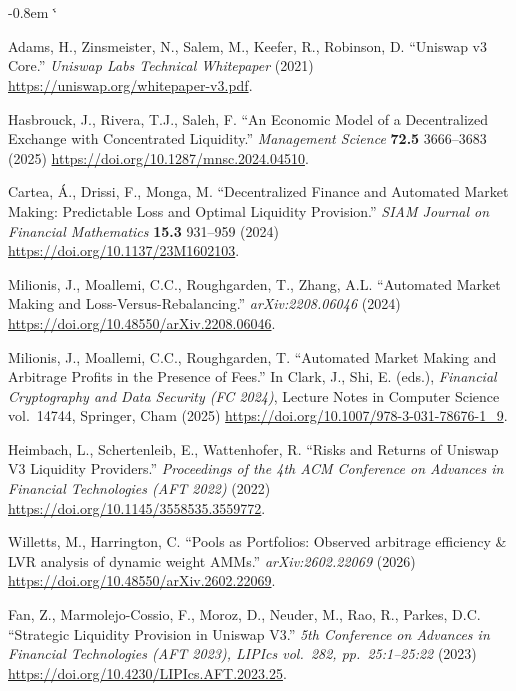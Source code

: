 \documentclass[11pt,a4paper]{article}
\makeatletter
\renewenvironment{thebibliography}[1]
  {\section*{\refname}%
   \fontsize{10pt}{12pt}\selectfont
   \list{\@biblabel{\@arabic\c@enumiv}}%
        {\settowidth\labelwidth{\@biblabel{#1}}%
         \leftmargin\labelwidth
         \advance\leftmargin-0.8em
         \advance\leftmargin\labelsep
         \setlength\itemindent{1em}%
         \setlength\itemsep{6pt plus 1pt minus 1pt}%
         \setlength\parsep{0pt}%
         \usecounter{enumiv}%
         \let\p@enumiv\@empty
         \renewcommand\theenumiv{\@arabic\c@enumiv}}%
   \sloppy\clubpenalty4000\widowpenalty4000\sfcode`\.\@m}
  {\def\@noitemerr{\@latex@warning{Empty `thebibliography' environment}}%
   \endlist}
\theoremstyle{plain}
\makeatother
\begin{document}
\pagestyle{plain}
\begin{thebibliography}{99}

Adams, H., Zinsmeister, N., Salem, M., Keefer, R., Robinson, D. ``Uniswap v3 Core.'' \emph{Uniswap Labs Technical Whitepaper} (2021) \url{https://uniswap.org/whitepaper-v3.pdf}.

Hasbrouck, J., Rivera, T.J., Saleh, F. ``An Economic Model of a Decentralized Exchange with Concentrated Liquidity.'' \emph{Management Science} \textbf{72.5} 3666--3683 (2025) \url{https://doi.org/10.1287/mnsc.2024.04510}.

Cartea, \'A., Drissi, F., Monga, M. ``Decentralized Finance and Automated Market Making: Predictable Loss and Optimal Liquidity Provision.'' \emph{SIAM Journal on Financial Mathematics} \textbf{15.3} 931--959 (2024) \url{https://doi.org/10.1137/23M1602103}.

Milionis, J., Moallemi, C.C., Roughgarden, T., Zhang, A.L. ``Automated Market Making and Loss-Versus-Rebalancing.'' \emph{arXiv:2208.06046} (2024) \url{https://doi.org/10.48550/arXiv.2208.06046}.

Milionis, J., Moallemi, C.C., Roughgarden, T. ``Automated Market Making and Arbitrage Profits in the Presence of Fees.'' In Clark, J., Shi, E. (eds.), \emph{Financial Cryptography and Data Security (FC 2024)}, Lecture Notes in Computer Science vol.~14744, Springer, Cham (2025) \url{https://doi.org/10.1007/978-3-031-78676-1_9}.

Heimbach, L., Schertenleib, E., Wattenhofer, R. ``Risks and Returns of Uniswap V3 Liquidity Providers.'' \emph{Proceedings of the 4th ACM Conference on Advances in Financial Technologies (AFT 2022)} (2022) \url{https://doi.org/10.1145/3558535.3559772}.

Willetts, M., Harrington, C. ``Pools as Portfolios: Observed arbitrage efficiency \& LVR analysis of dynamic weight AMMs.'' \emph{arXiv:2602.22069} (2026) \url{https://doi.org/10.48550/arXiv.2602.22069}.

Fan, Z., Marmolejo-Cossio, F., Moroz, D., Neuder, M., Rao, R., Parkes, D.C. ``Strategic Liquidity Provision in Uniswap V3.'' \emph{5th Conference on Advances in Financial Technologies (AFT 2023), LIPIcs vol.~282, pp.~25:1--25:22} (2023) \url{https://doi.org/10.4230/LIPIcs.AFT.2023.25}.


\end{thebibliography}
\end{document}
